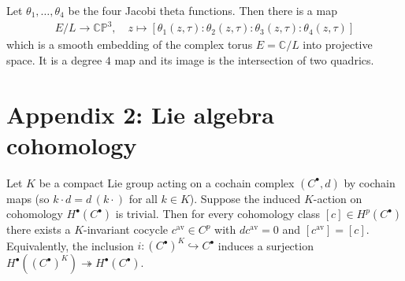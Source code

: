 \documentclass[12pt]{article}
\begin{document}
\begin{theorem}
    Let $\theta_1,\dots,\theta_4$ be the four Jacobi theta functions. Then there is a map \begin{align*}
        E/L \to \mathbb{CP}^3, \quad z \mapsto [\theta_1(z,\tau):\theta_2(z,\tau):\theta_3(z,\tau):\theta_4(z,\tau)]
    \end{align*} which is a smooth embedding of the complex torus $E=\mathbb{C}/L$ into projective space. It is a degree $4$ map and its image is the intersection of two quadrics.
\end{theorem}





\section{Appendix 2: Lie algebra cohomology}

\begin{lemma}\label{lem:invariant-representative}
    Let $K$ be a compact Lie group acting on a cochain complex $(C^\bullet,d)$ by
    cochain maps (so $k\cdot d = d\,(k\cdot)$ for all $k\in K$). Suppose the induced
    $K$-action on cohomology $H^\bullet(C^\bullet)$ is trivial. Then for every
    cohomology class $[c]\in H^p(C^\bullet)$ there exists a $K$-invariant cocycle
    $c^{\mathrm{av}}\in C^p$ with $dc^{\mathrm{av}}=0$ and $[c^{\mathrm{av}}]=[c]$.
    Equivalently, the inclusion $i:(C^\bullet)^K\hookrightarrow C^\bullet$
    induces a surjection $H^\bullet((C^\bullet)^K)\twoheadrightarrow H^\bullet(C^\bullet)$.
\end{lemma}
\end{document}
